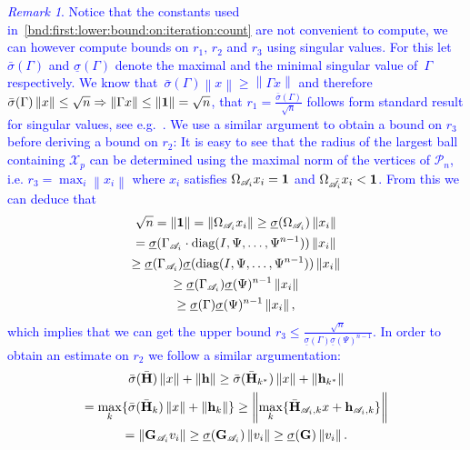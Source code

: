 \documentclass[journal]{IEEEtran}
\providecommand{\norm}[1]{\left\|#1\right\|}
\newcounter{thmcount}
\theoremstyle{remark}
\newtheorem{rem}[thmcount]{Remark}
\theoremstyle{definition}
\newcommand{\todo}[1]{\textcolor{blue}{#1}}
\begin{document}
%
\todo{\begin{rem}
Notice that the constants used in~\eqref{bnd:first:lower:bound:on:iteration:count} are not
convenient to compute, we can however compute bounds on $r_1,\, r_2$ and $r_3$ using 
singular values.
%
For this let $\bar\sigma(\Gamma)$ and $\underline\sigma(\Gamma)$ denote the maximal and the minimal
singular value of~$\Gamma$ respectively.
%
We know that~$\bar\sigma(\Gamma)\norm{x}\geq\norm{\Gamma x}$ and therefore $\bar\sigma(\Gamma)\norm{x}
\leq \sqrt{n}\Rightarrow \norm{\Gamma x}\leq\norm{\bf{1}}=\sqrt{n}$, that $r_1=\frac{\bar\sigma(\Gamma)}{\sqrt{n}}$
follows form standard result for singular values, see e.g.~\cite{Golub:1996}.
%
We use a similar argument to obtain a bound on $r_3$ before deriving a bound on $r_2$:
%
It is easy to see that the radius of the largest ball containing $\mathcal X_p$ can be determined using the maximal
norm of the vertices of $\mathcal P_n$, i.e. $r_3=\max_{i}\norm{x_i}$ where $x_i$ satisfies $\Omega_{\mathscr{A}_i} x_i={\bf{1}}$
and $\Omega_{\bar{\mathscr A}_i}x_i<{\bf{1}}$.
%
From this we can deduce that
%
\begin{multline}
  \sqrt{n}=\norm{\bf{1}}=\norm{\Omega_{\mathscr{A}_i}x_i}\geq\underline\sigma(\Omega_{\mathscr{A}_i})\norm{x_i}\\
  =\underline\sigma(\Gamma_{\mathscr{A}_i}\cdot \text{diag}(I,\Psi,\dots,\Psi^{n-1}))\norm{x_i}\\
  \geq\underline\sigma(\Gamma_{\mathscr{A}_i})\underline\sigma( \text{diag}(I,\Psi,\dots,\Psi^{n-1}))\norm{x_i}\\
  \geq\underline\sigma(\Gamma_{\mathscr{A}_i})\underline\sigma(\Psi)^{n-1}\norm{x_i}\\
  \geq\underline\sigma(\Gamma)\underline\sigma(\Psi)^{n-1}\norm{x_i},
\end{multline}
%
which implies that we can get the upper bound $r_3\leq\frac{\sqrt{n}}{\underline\sigma(\Gamma)
\underline\sigma(\Psi)^{n-1}}$.
%
In order to obtain an estimate on $r_2$ we follow a similar argumentation:
%
\begin{multline}
  \bar\sigma(\bar{\bf{H}})\norm{x}+\norm{{\bf{h}}}
  \geq\bar\sigma(\bar{\bf{H}}_{k^\ast})\norm{x}+\norm{{\bf{h}}_{k^\ast}}\\
  =\max_k\{\bar\sigma(\bar{\bf{H}}_k)\norm{x}+\norm{{\bf{h}}_k}\}
  \geq\norm{\max_k\{\bar{\bf{H}}_{\mathscr{A}_i,k} x + {\bf{h}}_{{\mathscr{A}_i},k}\}}\\ 
  =\norm{{\bf{G}}_{\mathscr{A}_i}v_i} \geq\underline\sigma({\bf{G}}_{\mathscr A_i})\norm{v_i}
  \geq\underline\sigma({\bf{G}})\norm{v_i}.

\end{multline}
\end{rem}}
\end{document}
